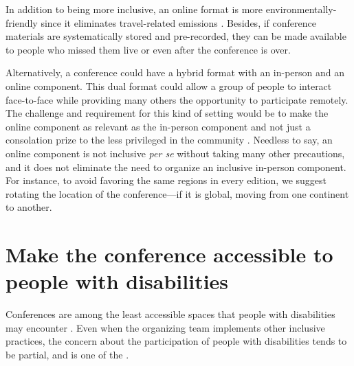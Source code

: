 \documentclass[10pt,letterpaper]{article}
\begin{document}
In addition to being more inclusive, an online format is more environmentally-friendly since it eliminates travel-related emissions \cite{sarabipourChangingScientificMeetings2021,ninerBetterWhomLeveling2021, gattrellComparisonCarbonCosts2021}. 
Besides, if conference materials are systematically stored and pre-recorded, they can be made available to people who missed them live or even after the conference is over. 

Alternatively, a conference could have a hybrid format with an in-person and an online component. This dual format could allow a group of people to interact face-to-face while providing many others the opportunity to participate remotely. The challenge and requirement for this kind of setting would be to make the online component as relevant as the in-person component and not just a consolation prize to the less privileged in the community \cite{ninerBetterWhomLeveling2021}.
Needless to say, an online component is not inclusive \textit{per se} without taking many other precautions, and it does not eliminate the need to organize an inclusive in-person component. 
For instance, to avoid favoring the same regions in every edition, we suggest rotating the location of the conference—if it is global, moving from one continent to another. 

\section{Make the conference accessible to people with disabilities}
\label{rule_accessibility}


Conferences are among the least accessible spaces that people with disabilities may encounter \cite{priceAccessImaginedConstruction2009}. Even when the organizing team implements other inclusive practices, the concern about the participation of people with disabilities tends to be partial, and is one of the . 
\end{document}
